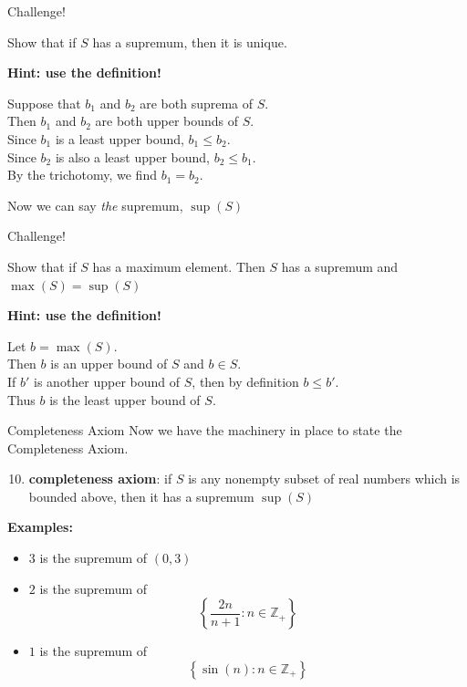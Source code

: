 \documentclass{beamer}
\begin{document}
\begin{frame}{Challenge!}
\begin{prob}
Show that if $S$ has a supremum, then it is unique.
\end{prob}
\pause
\textbf{Hint: use the definition!}
\pause
\begin{soln}
Suppose that $b_1$ and $b_2$ are both suprema of $S$.\\
\pause
Then $b_1$ and $b_2$ are both upper bounds of $S$.\\
\pause
Since $b_1$ is a least upper bound, $b_1\leq b_2$.\\
\pause
Since $b_2$ is also a least upper bound, $b_2\leq b_1$.\\
\pause
By the trichotomy, we find $b_1=b_2$.
\end{soln}
\pause
Now we can say \emph{the} supremum, $\sup(S)$
\end{frame}

\begin{frame}{Challenge!}
\begin{prob}
Show that if $S$ has a maximum element.  Then $S$ has a supremum and $\max(S)=\sup(S)$
\end{prob}
\pause
\textbf{Hint: use the definition!}
\pause
\begin{soln}
Let $b=\max(S)$.\\
\pause
Then $b$ is an upper bound of $S$ and $b\in S$.\\
\pause
If $b'$ is another upper bound of $S$, then by definition $b\leq b'$.\\
\pause
Thus $b$ is the least upper bound of $S$.
\end{soln}
\end{frame}

\begin{frame}{Completeness Axiom}
Now we have the machinery in place to state the Completeness Axiom.
\pause
\begin{enumerate}[\text{A}1]
\setcounter{enumi}{9}
\pause
\item \textbf{completeness axiom}: if $S$ is any nonempty subset of real numbers which is bounded above, then it has a supremum $\sup(S)$
\end{enumerate}
\pause
\textbf{Examples:}
\begin{itemize}
\pause
\item $3$ is the supremum of $(0,3)$
\pause
\item $2$ is the supremum of
$$\left\lbrace
\frac{2n}{n+1}: n\in\mathbb{Z}_+
\right\rbrace$$
\pause
\item $1$ is the supremum of
$$\left\lbrace
\sin(n): n\in\mathbb{Z}_+
\right\rbrace$$
\end{itemize}
\end{frame}
\end{document}
